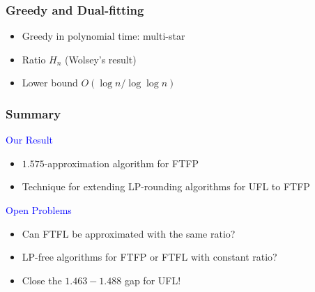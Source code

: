 \documentclass[hyperref,dvipsnames,svgnames]{beamer}
\begin{document}

\begin{frame}
  \frametitle{Greedy and Dual-fitting}
  \begin{itemize}
  \item Greedy in polynomial time: multi-star
  \item Ratio $H_n$ (Wolsey's result)
  \item Lower bound $O(\log n / \log\log n)$
  \end{itemize}
\end{frame}

\begin{frame}
  \frametitle{Summary}
  
{\large
  {\textcolor{blue}{Our Result}}

  \begin{itemize}
  	\item $1.575$-approximation algorithm for FTFP
	\item Technique for extending LP-rounding algorithms for UFL to FTFP
  \end{itemize}

\vspace{0.2in}
\pause
  {\textcolor{blue}{Open Problems}}

  \begin{itemize}
  \item Can FTFL be approximated with the same ratio?
  \item LP-free algorithms for FTFP or FTFL with constant ratio?
  \item Close the $1.463-1.488$ gap for UFL!
  \end{itemize}
}

\end{frame}
\end{document}
